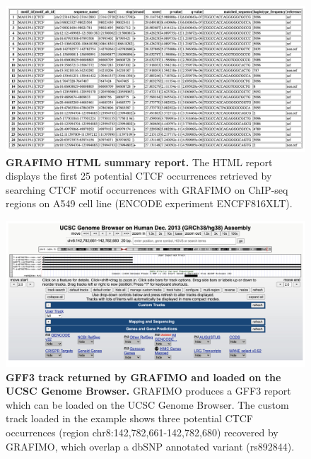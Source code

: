 \documentclass[a4paper, titlepage, openright]{book}
\newcommand{\grafimo}{GRAFIMO\xspace}
\begin{document}
\begin{figure}[!]
    \centering
    \includegraphics[width=\textwidth]{figures/grafimo-html.png}
    \caption[\grafimo HTML summary report]{\textbf{\grafimo HTML summary report.} The HTML report displays the first 25 potential CTCF occurrences retrieved by searching CTCF motif occurrences with \grafimo on ChIP-seq regions on A549 cell line (ENCODE experiment ENCFF816XLT).}
    \label{fig:grafimo-html}
\end{figure}

\begin{figure}[!]
    \centering
    \includegraphics[width=\textwidth]{figures/grafimo-genome-browser.png}
    \caption[GFF3 track returned by \grafimo and loaded on the UCSC Genome Browser]{\textbf{GFF3 track returned by GRAFIMO and loaded on the UCSC Genome Browser.} \grafimo produces a GFF3 report which can be loaded on the UCSC Genome Browser. The custom track loaded in the example shows three potential CTCF occurrences (region chr8:142,782,661-142,782,680) recovered by \grafimo, which overlap a dbSNP annotated variant (rs892844).}
    \label{fig:grafimo-genome-browser}
\end{figure}
\end{document}
